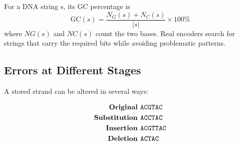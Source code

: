\documentclass{article}
\begin{document}
For a DNA string s, its GC percentage is
\begin{equation}
    \text{GC}(s) = \frac{N_G(s) + N_C(s)}{|s|} \times 100\%
\end{equation}
where $NG(s)$ and $NC(s)$ count the two bases. Real encoders search for strings that carry the required
bits while avoiding problematic patterns.



\subsection{Errors at Different Stages}
A stored strand can be altered in several ways:

\begin{align*}
    \centering
    \textbf{Original }     & \texttt{ACGTAC}  \\
    \textbf{Substitution } & \texttt{ACCTAC}  \\
    \textbf{Insertion }    & \texttt{ACGTTAC} \\
    \textbf{Deletion }     & \texttt{ACTAC}   \\
\end{align*}

\begin{table}[h]
    \caption{Where DNA-storage errors arise and how systems respond.}
    \label{tab:two}
\end{table}
\end{document}
